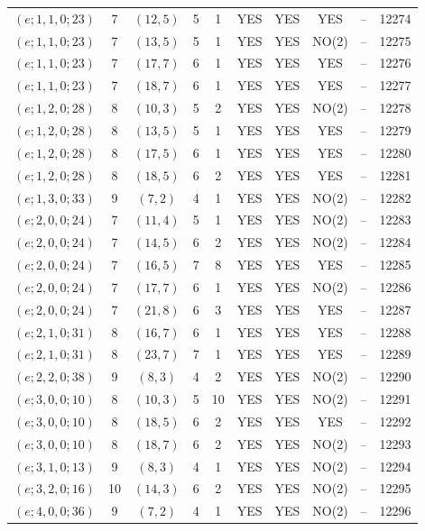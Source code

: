 \begin{longtable}{|c|c|c|c|c|c|c|c|c|c|}
$(e; 1, 1, 0; 23)$ & 7 & $(12, 5)$ & 5 & 1 & YES & YES & YES & -- & 12274\\
$(e; 1, 1, 0; 23)$ & 7 & $(13, 5)$ & 5 & 1 & YES & YES & NO(2) & -- & 12275\\
$(e; 1, 1, 0; 23)$ & 7 & $(17, 7)$ & 6 & 1 & YES & YES & YES & -- & 12276\\
$(e; 1, 1, 0; 23)$ & 7 & $(18, 7)$ & 6 & 1 & YES & YES & YES & -- & 12277\\
$(e; 1, 2, 0; 28)$ & 8 & $(10, 3)$ & 5 & 2 & YES & YES & NO(2) & -- & 12278\\
$(e; 1, 2, 0; 28)$ & 8 & $(13, 5)$ & 5 & 1 & YES & YES & YES & -- & 12279\\
$(e; 1, 2, 0; 28)$ & 8 & $(17, 5)$ & 6 & 1 & YES & YES & YES & -- & 12280\\
$(e; 1, 2, 0; 28)$ & 8 & $(18, 5)$ & 6 & 2 & YES & YES & YES & -- & 12281\\
$(e; 1, 3, 0; 33)$ & 9 & $(7, 2)$ & 4 & 1 & YES & YES & NO(2) & -- & 12282\\
$(e; 2, 0, 0; 24)$ & 7 & $(11, 4)$ & 5 & 1 & YES & YES & NO(2) & -- & 12283\\
$(e; 2, 0, 0; 24)$ & 7 & $(14, 5)$ & 6 & 2 & YES & YES & NO(2) & -- & 12284\\
$(e; 2, 0, 0; 24)$ & 7 & $(16, 5)$ & 7 & 8 & YES & YES & YES & -- & 12285\\
$(e; 2, 0, 0; 24)$ & 7 & $(17, 7)$ & 6 & 1 & YES & YES & NO(2) & -- & 12286\\
$(e; 2, 0, 0; 24)$ & 7 & $(21, 8)$ & 6 & 3 & YES & YES & YES & -- & 12287\\
$(e; 2, 1, 0; 31)$ & 8 & $(16, 7)$ & 6 & 1 & YES & YES & YES & -- & 12288\\
$(e; 2, 1, 0; 31)$ & 8 & $(23, 7)$ & 7 & 1 & YES & YES & YES & -- & 12289\\
$(e; 2, 2, 0; 38)$ & 9 & $(8, 3)$ & 4 & 2 & YES & YES & NO(2) & -- & 12290\\
$(e; 3, 0, 0; 10)$ & 8 & $(10, 3)$ & 5 & 10 & YES & YES & NO(2) & -- & 12291\\
$(e; 3, 0, 0; 10)$ & 8 & $(18, 5)$ & 6 & 2 & YES & YES & YES & -- & 12292\\
$(e; 3, 0, 0; 10)$ & 8 & $(18, 7)$ & 6 & 2 & YES & YES & NO(2) & -- & 12293\\
$(e; 3, 1, 0; 13)$ & 9 & $(8, 3)$ & 4 & 1 & YES & YES & NO(2) & -- & 12294\\
$(e; 3, 2, 0; 16)$ & 10 & $(14, 3)$ & 6 & 2 & YES & YES & NO(2) & -- & 12295\\
$(e; 4, 0, 0; 36)$ & 9 & $(7, 2)$ & 4 & 1 & YES & YES & NO(2) & -- & 12296\\

\end{longtable}
